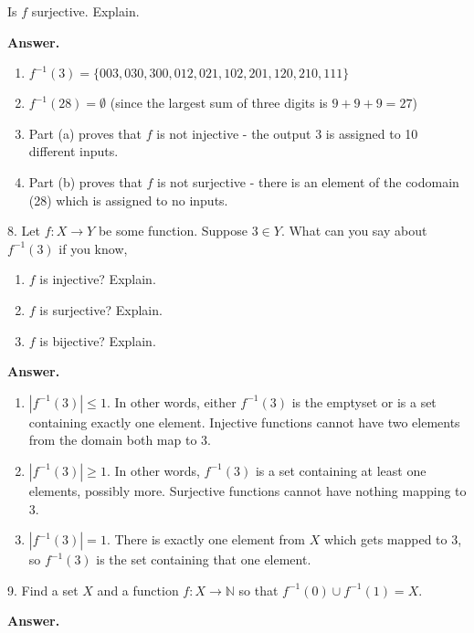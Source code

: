\documentclass[10pt,]{book}
\theoremstyle{plain}
\theoremstyle{definition}
\theoremstyle{definition}
\theoremstyle{definition}
\numberwithin{equation}{section}
\def\N{\mathbb N}
\def\inv{^{-1}}
\begin{document}
\begin{exerciselist}
\begin{enumerate}[label=(\alph*)]
Is \(f\) surjective. Explain.
%
\end{enumerate}
\par\smallskip
\par\smallskip
\noindent\textbf{Answer.}\hypertarget{answer-23}{}\quad
\leavevmode%
\begin{enumerate}[label=(\alph*)]
\item\hypertarget{li-219}{}\(f\inv(3) = \{003, 030, 300, 012, 021, 102, 201, 120, 210, 111\}\)\item\hypertarget{li-220}{}\(f\inv(28) = \emptyset\) (since the largest sum of three digits is \(9+9+9 = 27\))\item\hypertarget{li-221}{}
Part (a) proves that \(f\) is not injective - the output 3 is assigned to 10 different inputs.
%
\item\hypertarget{li-222}{}
Part (b) proves that \(f\) is not surjective - there is an element of the codomain (28) which is assigned to no inputs.
%
\end{enumerate}
\item[8.]\hypertarget{exercise-24}{}
Let \(f:X \to Y\) be some function. Suppose \(3 \in Y\). What can you say about \(f\inv(3)\) if you know,
%
\leavevmode%
\begin{enumerate}[label=(\alph*)]
\item\hypertarget{li-223}{}\(f\) is injective? Explain.\item\hypertarget{li-224}{}\(f\) is surjective? Explain.\item\hypertarget{li-225}{}\(f\) is bijective? Explain.\end{enumerate}
\par\smallskip
\par\smallskip
\noindent\textbf{Answer.}\hypertarget{answer-24}{}\quad
\leavevmode%
\begin{enumerate}[label=(\alph*)]
\item\hypertarget{li-226}{}\(|f\inv(3)| \le 1\).  In other words, either \(f\inv(3)\) is the emptyset or is a set containing exactly one element.  Injective functions cannot have two elements from the domain both map to 3.\item\hypertarget{li-227}{}\(|f\inv(3)| \ge 1\).  In other words, \(f\inv(3)\) is a set containing at least one elements, possibly more.  Surjective functions cannot have nothing mapping to 3.\item\hypertarget{li-228}{}\(|f\inv(3)| = 1\).  There is exactly one element from \(X\) which gets mapped to 3, so \(f\inv(3)\) is the set containing that one element.\end{enumerate}
\item[9.]\hypertarget{exercise-25}{}
Find a set \(X\) and a function \(f:X \to \N\) so that \(f\inv(0) \cup f\inv(1) = X\).
%
\par\smallskip
\par\smallskip
\noindent\textbf{Answer.}\hypertarget{answer-25}{}\quad


\end{exerciselist}
\end{document}
